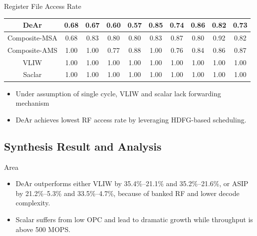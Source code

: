 \documentclass{beamer}
\begin{document}
\begin{CJK}{UTF8}{bkai}
\begin{frame}{Register File Access Rate}
\begin{table}[!ht]
{\begin{tabular}{|c|c|c|c|c|c|c|c|c|c|}
                    DeAr  &   0.68  &   0.67  &  0.60  &   0.57  &   0.85  &   0.74  &   0.86  &   0.82  &   0.73     \\ \hline 
                    Composite-MSA  &   0.68  &   0.83  &   0.80  &   0.80  &   0.83  &   0.87  &   0.80  &   0.92  &   0.82     \\ \hline 
                    Composite-AMS  &   1.00  &   1.00  &   0.77  &   0.88  &   1.00  &   0.76  &   0.84  &   0.86  &   0.87     \\ \hline 
                    VLIW  &   1.00  &   1.00  &   1.00  &   1.00  &   1.00  &   1.00  &   1.00  &   1.00  &   1.00     \\ \hline 
                    Saclar  &   1.00  &   1.00  &   1.00  &   1.00  &   1.00  &   1.00  &   1.00  &   1.00  &   1.00     \\ \hline 
                \end{tabular}
            }
        \end{table}
        \begin{itemize}
            \item Under assumption of single cycle, VLIW and scalar lack forwarding mechanism
            \item DeAr achieves lowest RF access rate by leveraging HDFG-based scheduling.
        \end{itemize}
    \end{frame}

    \subsection{Synthesis Result and Analysis}

    \begin{frame}{Area}
        \begin{figure}[t]
            \begin{center}
            \end{center}
        \end{figure}
        \begin{itemize}
            \item DeAr outperforms either VLIW by 35.4\%--21.1\% and 35.2\%--21.6\%, 
                or ASIP by 21.2\%--5.3\% and 33.5\%--4.7\%, because of banked RF and lower decode complexity.
            \item Scalar suffers from low OPC and lead to dramatic growth while throughput is above 500 MOPS.
        \end{itemize}
    \end{frame}


\end{CJK}
\end{document}
